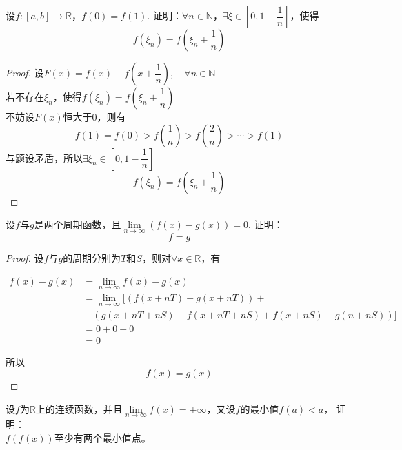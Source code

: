 \begin{proposition}

    设$f:[a,b]\to \mathbb{R}$，$f(0)=f(1)$.
    证明：$\forall n\in \mathbb{N}$，$\exists \xi \in \left[0,1-\dfrac{1}{n}\right]$，使得
    $$f(\xi_n) = f\left(\xi_n+\dfrac{1}{n}\right)$$

\end{proposition}

\begin{proof}
    
    设$F(x) = f(x) - f\left(x + \dfrac{1}{n}\right),\quad \forall n \in \mathbb{N}$\\
    若不存在$\xi_n$，使得$f(\xi_n) = f\left(\xi_n+\dfrac{1}{n}\right)$\\
    不妨设$F(x)$恒大于$0$，则有
    $$f(1) = f(0) > f\left(\dfrac{1}{n}\right) > f\left(\dfrac{2}{n}\right) > \cdots > f(1)$$
    与题设矛盾，所以$\exists \xi_n\in \left[0,1-\dfrac{1}{n}\right]$
    $$f(\xi_n) = f\left(\xi_n + \dfrac{1}{n}\right)$$

\end{proof}

\begin{proposition}
    
    设$f$与$g$是两个周期函数，且$\lim\limits_{n\to\infty}{(f(x)-g(x))}=0$.
    证明：
    $$f = g $$

\end{proposition}

\begin{proof}
    
    设$f$与$g$的周期分别为$T$和$S$，则对$\forall x \in \mathbb{R}$，有
    
    \begin{align*}
        f(x)-g(x) &= \lim_{n\to\infty}{f(x)-g(x)}\\
        &= \lim_{n\to\infty}[(f(x+nT)-g(x+nT))+\\
        &\quad(g(x+nT+nS)-f(x+nT+nS)+f(x+nS)-g(n+nS))]\\
        &= 0 + 0 + 0\\
        &= 0
    \end{align*}

    所以
    $$f(x)=g(x)$$

\end{proof}

\begin{proposition}
    
    设$f$为$\mathbb{R}$上的连续函数，并且$\lim\limits_{n\to\infty}{f(x)}=+\infty$，又设$f$的最小值$f(a)<a$，
    证明：\\
    $f(f(x))$至少有两个最小值点。
\end{proposition}

